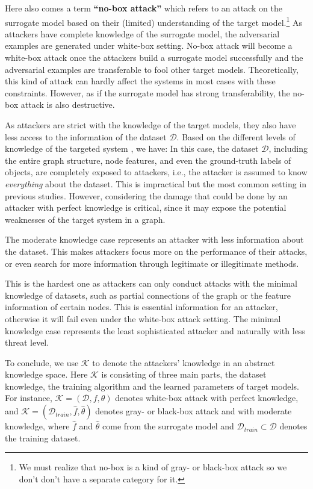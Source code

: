 Here also comes a term \textbf{``no-box attack''} \cite{sharma2018gradient} which refers to an attack on the surrogate model based on their (limited) understanding of the target model.\footnote{We must realize that no-box is a kind of gray- or black-box attack so we don't don't have a separate category for it.} As attackers have complete knowledge of the surrogate model, the adversarial examples are generated under white-box setting. No-box attack will become a white-box attack once the attackers build a surrogate model successfully and the adversarial examples are transferable to fool other target models. Theoretically, this kind of attack can hardly affect the systems in most cases with these constraints. However, as if the surrogate model has strong transferability, the no-box attack is also destructive.

As attackers are strict with the knowledge of the target models, they also have less access to the information of the dataset $\mathcal{D}$. Based on the different levels of knowledge of the targeted system \cite{chen2017practical}, we have:
In this case, the dataset $\mathcal{D}$, including the entire graph structure, node features, and even the ground-truth labels of objects, are completely exposed to attackers, i.e., the attacker is assumed to know \emph{everything} about the dataset. This is impractical but the most common setting in previous studies. However, considering the damage that could be done by an attacker with perfect knowledge is critical, since it may expose the potential weaknesses of the target system in a graph.

The moderate knowledge case represents an attacker with less information about the dataset. This makes attackers focus more on the performance of their attacks, or even search for more information through legitimate or illegitimate methods.

This is the hardest one as attackers can only conduct attacks with the minimal knowledge of datasets, such as partial connections of the graph or the feature information of certain nodes. This is essential information for an attacker, otherwise it will fail even under the white-box attack setting. The minimal knowledge case represents the least sophisticated attacker and naturally with less threat level.

To conclude, we use $\mathcal{K}$ to denote the attackers' knowledge in an abstract knowledge space. Here $\mathcal{K}$ is consisting of three main parts, the dataset knowledge, the training algorithm and the learned parameters of target models. For instance, $\mathcal{K}=(\mathcal{D},f,\theta)$ denotes white-box attack with perfect knowledge, and $\mathcal{K}=(\mathcal{D}_{train},\hat{f},\hat{\theta})$ denotes gray- or black-box attack and with moderate knowledge, where $\hat{f}$ and $\hat{\theta}$ come from the surrogate model and $\mathcal{D}_{train}\subset \mathcal{D}$ denotes the training dataset.

